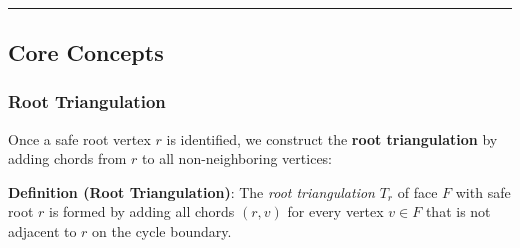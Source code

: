 ﻿﻿\documentclass[12pt,a4paper]{article}
\theoremstyle{definition}
\theoremstyle{remark}
\begin{document}





\noindent\rule{\textwidth}{0.4pt}

\subsection{Core Concepts}

\subsubsection{Root Triangulation}

Once a safe root vertex $r$ is identified, we construct the \textbf{root triangulation} by adding chords from $r$ to all non-neighboring vertices:

\textbf{Definition (Root Triangulation)}: The \textit{root triangulation} $T_r$ of face $F$ with safe root $r$ is formed by adding all chords $(r, v)$ for every vertex $v \in F$ that is not adjacent to $r$ on the cycle boundary.

\end{document}
